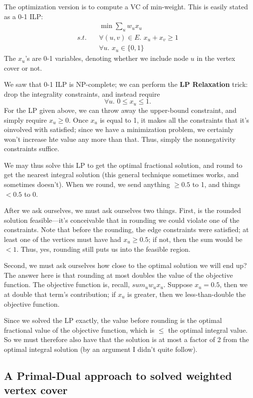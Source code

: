\documentclass{article}
\begin{document}
The optimization version is to compute a VC of min-weight.
This is easily stated as a 0-1 ILP:
\begin{align}
& \min \sum_u w_u x_u \\
s.t.\quad & \forall (u,v)\in E.\,\, x_u + x_v \geq 1 \\
& \forall u.\,\, x_u \in \{0,1\}
\end{align}
The $x_u$'s are 0-1 variables, denoting whether we include node $u$ in the
vertex cover or not.

We saw that 0-1 ILP is NP-complete; we can perform the \textbf{LP Relaxation}
trick: drop the integrality constraints, and instead require
$$
\forall u.\,\, 0\leq x_u \leq 1.
$$
For the LP given above, we can throw away the upper-bound constraint, and
simply require $x_u \geq 0$.
Once $x_u$ is equal to 1, it makes all the constraints that it's oinvolved
with satisfied; since we have a minimization problem, we certainly won't
increase hte value any more than that.
Thus, simply the nonnegativity constraints suffice.

We may thus solve this LP to get the optimal fractional solution, and
round to get the nearest integral solution (this general technique sometimes 
works, and sometimes doesn't).
When we round, we send anything $\geq 0.5$ to 1, and things $< 0.5$ to 0.

After we ask ourselves, we must ask ourselves two things. First, is the
rounded solution feasible---it's conceivable that in rounding we could violate
one of the constraints.
Note that before the rounding, the edge constraints were satisfied; at least
one of the vertices must have had $x_u \geq 0.5$; if not, then the sum
would be $< 1$. Thus, yes, rounding still puts us into the feasible region.

Second, we must ask ourselves how close to the optimal solution we will end up?
The answer here is that rounding at most doubles the value of the objective
function.
The objective function is, recall, 
$sum_u w_u x_u$.
Suppose $x_u = 0.5$, then we at double that term's contribution; if $x_u$
is greater, then we less-than-double the objective function.

Since we solved the LP exactly, the value before rounding is the optimal
fractional value of the objective function, which is $\leq$ the optimal
integral value. So we must therefore also have that the solution is
at most a factor of 2 from the optimal integral solution (by an argument
I didn't quite follow).

\subsection{A Primal-Dual approach to solved weighted vertex cover}
\end{document}
